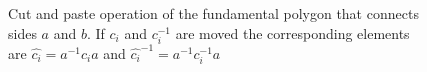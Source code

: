 



\begin{figure}
\center{\scalebox{0.6}{}}
\caption{Cut and paste operation of the fundamental polygon that connects sides $a$ and $b$. 
If $c_i$ and $c_i^{-1}$ are moved the corresponding elements are $\hat{c_i}=a^{-1}c_ia$ and $\hat{c_i}^{-1}=a^{-1}c_i^{-1}a$}
\end{figure}

 